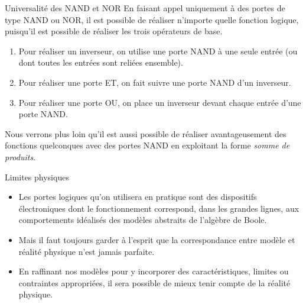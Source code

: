 \documentclass[presentation]{beamer}
\begin{document}
\begin{frame}[label={sec:org1d3c46e}]{Universalité des NAND et NOR}
En faisant appel uniquement à des portes de type NAND ou NOR, il est possible de réaliser n'importe quelle fonction logique, puisqu'il est possible de réaliser les trois opérateurs de base.

\begin{enumerate}
\item Pour réaliser un inverseur, on utilise une porte NAND à une seule entrée (ou dont toutes les entrées sont reliées ensemble).
\item Pour réaliser une porte ET, on fait suivre une porte NAND d'un inverseur.
\item Pour réaliser une porte OU, on place un inverseur devant chaque entrée d'une porte NAND.
\end{enumerate}

Nous verrons plus loin qu'il est aussi possible de réaliser avantageusement des fonctions quelconques avec des portes NAND en exploitant la forme \emph{somme de produits}.
\end{frame}

\begin{frame}[label={sec:orgff7186a}]{Limites physiques}
\begin{itemize}
\item Les portes logiques qu'on utilisera en pratique sont des dispositifs électroniques dont le fonctionnement correspond, dans les grandes lignes, aux comportements idéalisés des modèles abstraits de l'algèbre de Boole.

\item Mais il faut toujours garder à l'esprit que la correspondance entre modèle et réalité physique n'est jamais parfaite.

\item En raffinant nos modèles pour y incorporer des caractéristiques, limites ou contraintes appropriées, il sera possible de mieux tenir compte de la réalité physique.
\end{itemize}
\end{frame}
\end{document}
